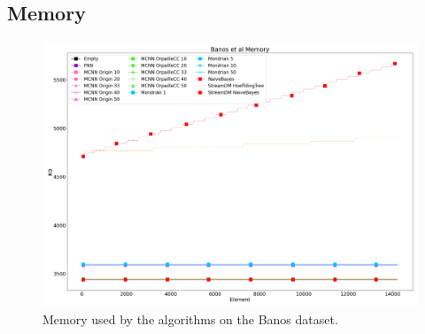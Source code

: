 \subsection{Memory}
\begin{figure}[H]
	\includegraphics[width=\linewidth]{figures/results/banos_memory.png}
	\caption{Memory used by the algorithms on the Banos dataset.}
\end{figure}



